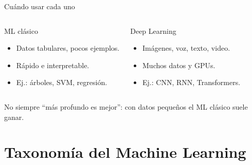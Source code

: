 \documentclass[aspectratio=169]{beamer}
\begin{document}
\begin{frame}{Cu\'ando usar cada uno}
  \begin{columns}[t]
      \begin{block}{ML cl\'asico}
        \begin{itemize}
          \item Datos tabulares, pocos ejemplos.
          \item R\'apido e interpretable.
          \item Ej.: \'arboles, SVM, regresi\'on.
        \end{itemize}
      \end{block}
      \begin{block}{Deep Learning}
        \begin{itemize}
          \item Im\'agenes, voz, texto, video.
          \item Muchos datos y GPUs.
          \item Ej.: CNN, RNN, Transformers.
        \end{itemize}
      \end{block}
  \end{columns}
  \vspace{0.5em}
  No siempre ``m\'as profundo es mejor'': con datos peque\~nos el ML cl\'asico
  suele ganar.
\end{frame}

\section{Taxonom\'ia del Machine Learning}
\end{document}
